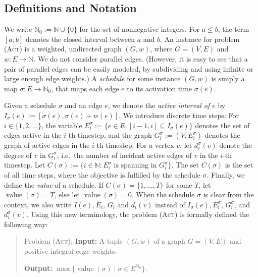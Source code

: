 \documentclass[runningheads]{llncs}
\numberwithin{equation}{section}
\newcommand{\N}{\mathbb{N}}
\newcommand{\set}[1]{\{ #1 \}}
\newcommand{\fromto}[2]{\set{#1, \ldots, #2}}
\newcommand{\act}{\textsc{(Act)}}
\DeclareMathOperator{\val}{\text{value}}
\begin{document}
\subsection{Definitions and Notation}
\label{sec_notation}

We write $\N_0 := \N \cup \set{0}$ for the set of nonnegative integers. For $a \leq b$, the term $[a, b]$ denotes the closed interval between $a$ and $b$. An instance for problem {\act} is a weighted, undirected graph $(G, w)$, where $G = (V, E)$ and $w : E \rightarrow \N$. We do not consider parallel edges. (However, it is easy to see that a pair of parallel edges can be easily modeled, by subdividing and using infinite or large enough edge weights.) A \emph{schedule} for some instance $(G, w)$ is simply a map $\sigma : E \rightarrow \N_0$, that maps each edge $e$ to its activation time $\sigma(e)$. 

Given a schedule $\sigma$ and an edge $e$, we denote the \emph{active interval of $e$} by $I_\sigma(e) := [\sigma(e), \sigma(e) + w(e)]$. We introduce discrete time steps: For $i \in \{1, 2, \dots\}$, the variable $E^\sigma_i := \set{e \in E : [i-1, i] \subseteq I_\sigma(e)}$ denotes the set of edges active in the $i$-th timestep, and the graph $G^\sigma_i := (V, E^\sigma_i)$ denotes the graph of active edges in the $i$-th timestep. For a vertex $v$, let $d^\sigma_i(v)$ denote the degree of $v$ in $G^\sigma_i$, i.e.\ the number of incident active edges of $v$ in the $i$-th timestep.
Let $C(\sigma) := \set{i \in \N : E_i^\sigma \text{ is spanning in } G^\sigma_i}$. The set $C(\sigma)$ is the set of all time steps, where the objective is fulfilled by the schedule $\sigma$. Finally, we define the \emph{value} of a schedule. If $C(\sigma) = \fromto{1}{T}$ for some $T$, let $\val(\sigma) = T$, else let $\val(\sigma) = 0$. When the schedule $\sigma$ is clear from the context, we also write $I(e), E_i$, $G_i$ and $d_i(v)$ instead of $I_\sigma(e), E^\sigma_i$, $G^\sigma_i$, and $d^\sigma_i(v)$. Using this new terminology, the problem {\act} is formally defined the following way:

\begin{quote}
Problem {\act}: \textbf{Input:} A tuple $(G, w)$ of a graph $G = (V,E)$ and positive integral edge weights.

\textbf{Output:} $\max\set{\val(\sigma) \mid \sigma \in E^{\N_0}}$.
\end{quote}
\end{document}
